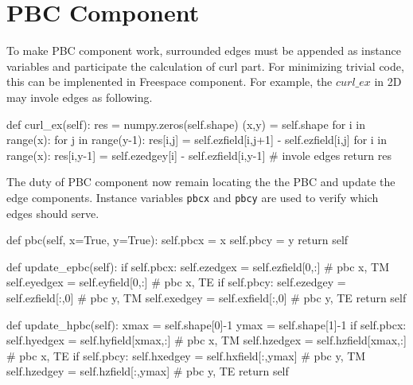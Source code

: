 \section{PBC Component}
To make PBC component work, surrounded edges must be appended as instance variables and participate the calculation of
curl part. For minimizing trivial code, this can be implenented in Freespace component. For example, the $curl\_ex$ in
2D may invole edges as following.
\begin{code}
    def curl_ex(self):
        res = numpy.zeros(self.shape)
        (x,y) = self.shape
        for i in range(x):
            for j in range(y-1):
                res[i,j] = self.ezfield[i,j+1] - self.ezfield[i,j]
        for i in range(x):
            res[i,y-1] = self.ezedgey[i] - self.ezfield[i,y-1]  # invole edges
        return res
\end{code}
The duty of PBC component now remain locating the the PBC and update the edge components. Instance variables
\texttt{pbcx} and \texttt{pbcy} are used to verify which edges should serve.
\begin{code}
    def pbc(self, x=True, y=True):
        self.pbcx = x
        self.pbcy = y
        return self

    def update_epbc(self):
        if self.pbcx:
            self.ezedgex = self.ezfield[0,:] # pbc x, TM
            self.eyedgex = self.eyfield[0,:] # pbc x, TE
        if self.pbcy:
            self.ezedgey = self.ezfield[:,0] # pbc y, TM
            self.exedgey = self.exfield[:,0] # pbc y, TE
        return self

    def update_hpbc(self):
        xmax = self.shape[0]-1
        ymax = self.shape[1]-1
        if self.pbcx:
            self.hyedgex = self.hyfield[xmax,:] # pbc x, TM
            self.hzedgex = self.hzfield[xmax,:] # pbc x, TE
        if self.pbcy:
            self.hxedgey = self.hxfield[:,ymax] # pbc y, TM
            self.hzedgey = self.hzfield[:,ymax] # pbc y, TE
        return self
\end{code}

